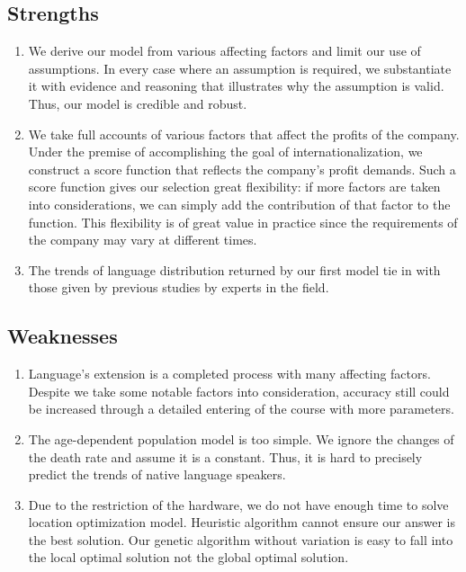 \documentclass{mcmthesis}
\begin{document}
\subsection{Strengths}
\begin{enumerate}[1]
\item We derive our model from various affecting factors and limit our use of assumptions. In every case where an assumption is required, we substantiate it with evidence and reasoning that illustrates why the assumption is valid. Thus, our model is credible and robust. 
\item We take full accounts of various factors that affect the profits of the company. Under the premise of accomplishing the goal of internationalization, we construct a score function that reflects the company's profit demands. Such a score function gives our selection great flexibility:  if more factors are taken into considerations, we can simply add the contribution of that factor to the function. This flexibility is of great value in practice since the requirements of the company may vary at different times. 
\item The trends of language distribution returned  by  our first model  tie  in  with  those given by previous studies  by experts in the  field. 
\end{enumerate}

\subsection{Weaknesses}
\begin{enumerate}[1]
\item Language's extension is a completed process with many affecting factors. Despite we take some notable factors into consideration, accuracy still could be increased through a detailed entering of the course with more parameters. 
\item The age-dependent population model is too simple. We ignore the changes of the death rate and assume it is a constant. Thus, it is hard to precisely predict the trends of native language speakers. 
\item Due to the restriction of the hardware, we do not have enough time to solve location optimization model. Heuristic algorithm cannot ensure our answer is the best solution. Our genetic algorithm without variation is easy to fall into the local optimal solution not the global optimal solution. 
\end{enumerate}
\end{document}

